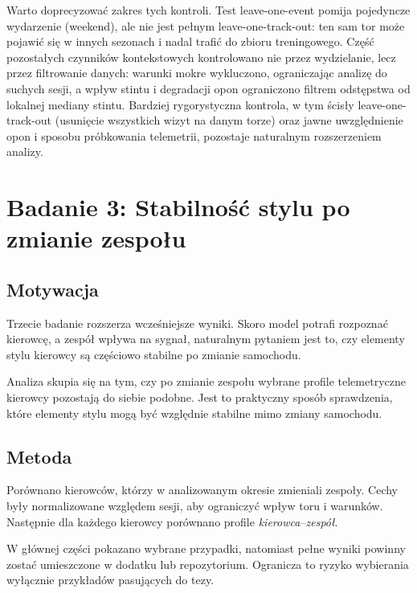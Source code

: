 \documentclass[printmode,pl]{mgr}
\begin{document}
Warto doprecyzować zakres tych kontroli. Test leave-one-event pomija pojedyncze wydarzenie (weekend), ale nie jest pełnym leave-one-track-out: ten sam tor może pojawić się w innych sezonach i nadal trafić do zbioru treningowego. Część pozostałych czynników kontekstowych kontrolowano nie przez wydzielanie, lecz przez filtrowanie danych: warunki mokre wykluczono, ograniczając analizę do suchych sesji, a wpływ stintu i degradacji opon ograniczono filtrem odstępstwa od lokalnej mediany stintu. Bardziej rygorystyczna kontrola, w tym ścisły leave-one-track-out (usunięcie wszystkich wizyt na danym torze) oraz jawne uwzględnienie opon i sposobu próbkowania telemetrii, pozostaje naturalnym rozszerzeniem analizy.

\chapter{Badanie 3: Stabilność stylu po zmianie zespołu}

\section{Motywacja}

Trzecie badanie rozszerza wcześniejsze wyniki. Skoro model potrafi rozpoznać kierowcę, a zespół wpływa na sygnał, naturalnym pytaniem jest to, czy elementy stylu kierowcy są częściowo stabilne po zmianie samochodu.

Analiza skupia się na tym, czy po zmianie zespołu wybrane profile telemetryczne kierowcy pozostają do siebie podobne. Jest to praktyczny sposób sprawdzenia, które elementy stylu mogą być względnie stabilne mimo zmiany samochodu.

\section{Metoda}

Porównano kierowców, którzy w analizowanym okresie zmieniali zespoły. Cechy były normalizowane względem sesji, aby ograniczyć wpływ toru i warunków. Następnie dla każdego kierowcy porównano profile \emph{kierowca--zespół}.

W głównej części pokazano wybrane przypadki, natomiast pełne wyniki powinny zostać umieszczone w dodatku lub repozytorium. Ogranicza to ryzyko wybierania wyłącznie przykładów pasujących do tezy.
\end{document}
